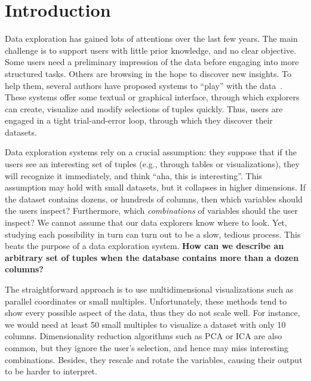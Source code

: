\section{Introduction}
\label{sec:introdction}
Data exploration has gained lots of attentions over the last few years. The
main challenge is to support users with little prior knowledge, and no clear
objective. Some users need a preliminary impression of the data before engaging
into more structured tasks. Others are browsing in the hope to discover new
insights.  To help them, several authors have proposed systems to ``play'' with
the data~\cite{abouzied2012dataplay, sellam2013meet, liarou2014dbtouch,
dimitriadou2014explore}. These systems offer some textual or graphical
interface, through which explorers can create, visualize and modify selections of
tuples quickly. Thus, users are engaged in a tight trial-and-error loop,
through which they discover their datasets. 

Data exploration systems rely on a crucial assumption: they suppose that if the
users see an interesting set of tuples (e.g., through tables or
visualizations), they will recognize it immediately, and think ``aha, this is
interesting''. This assumption may hold with small datasets, but it collapses
in higher dimensions. If the dataset contains  dozens, or hundreds of columns,
then which variables should the users inspect? Furthermore, which
\emph{combinations} of variables should the user inspect? We cannot assume that
our data explorers know where to look.  Yet, studying each possibility in turn
can turn out to be a slow, tedious process. This beats the purpose of a data
exploration system.
\textbf{How can we describe an arbitrary set of tuples when the
database contains more than a dozen columns?}

The straightforward approach is to use multidimensional visualizations such as
parallel coordinates or small multiples. Unfortunately, these methods tend to
show every possible aspect of the data, thus they do not scale well. For
instance, we would need at least 50 small multiples to visualize a dataset with
only 10 columns. Dimensionality reduction algorithms such as PCA or ICA are
also common, but they ignore the user's selection, and hence may
miss interesting combinations.  Besides, they rescale and rotate the
variables, causing their output to be harder to interpret.


